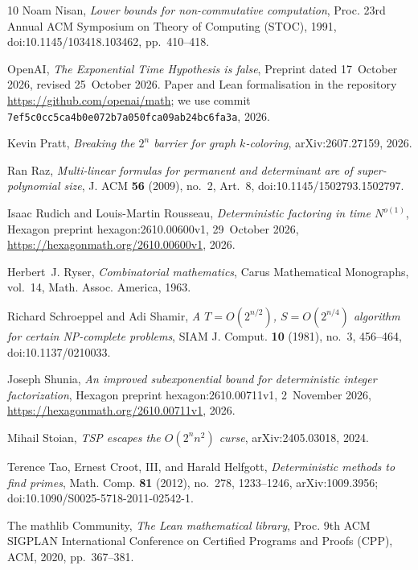 \documentclass[10pt]{amsart}
\theoremstyle{plain}
\theoremstyle{definition}
\theoremstyle{remark}
\numberwithin{equation}{section}
\begin{document}
\begin{thebibliography}{10}
Noam Nisan, \emph{Lower bounds for non-commutative computation}, Proc. 23rd
  Annual ACM Symposium on Theory of Computing (STOC), 1991,
  doi:10.1145/103418.103462, pp.~410--418.

{OpenAI}, \emph{The {E}xponential {T}ime {H}ypothesis is false}, Preprint dated
  17~October 2026, revised 25~October 2026. Paper and Lean formalisation in the
  repository \url{https://github.com/openai/math}; we use commit
  \texttt{7ef5c0cc5ca4b0e072b7a050fca09ab24bc6fa3a}, 2026.

Kevin Pratt, \emph{Breaking the $2^n$ barrier for graph $k$-coloring},
  arXiv:2607.27159, 2026.

Ran Raz, \emph{Multi-linear formulas for permanent and determinant are of
  super-polynomial size}, J. ACM \textbf{56} (2009), no.~2, Art.~8,
  doi:10.1145/1502793.1502797.

Isaac Rudich and Louis-Martin Rousseau, \emph{Deterministic factoring in time
  ${N}^{o(1)}$}, Hexagon preprint hexagon:2610.00600v1, 29~October 2026,
  \url{https://hexagonmath.org/2610.00600v1}, 2026.

Herbert~J. Ryser, \emph{Combinatorial mathematics}, Carus Mathematical
  Monographs, vol.~14, Math. Assoc. America, 1963.

Richard Schroeppel and Adi Shamir, \emph{A ${T}={O}(2^{n/2})$,
  ${S}={O}(2^{n/4})$ algorithm for certain {NP}-complete problems}, SIAM J.
  Comput. \textbf{10} (1981), no.~3, 456--464, doi:10.1137/0210033.

Joseph Shunia, \emph{An improved subexponential bound for deterministic integer
  factorization}, Hexagon preprint hexagon:2610.00711v1, 2~November 2026,
  \url{https://hexagonmath.org/2610.00711v1}, 2026.

Mihail Stoian, \emph{{TSP} escapes the ${O}(2^n n^2)$ curse}, arXiv:2405.03018,
  2024.

Terence Tao, Ernest Croot, III, and Harald Helfgott, \emph{Deterministic
  methods to find primes}, Math. Comp. \textbf{81} (2012), no.~278, 1233--1246,
  arXiv:1009.3956; doi:10.1090/S0025-5718-2011-02542-1.

{The mathlib Community}, \emph{The {L}ean mathematical library}, Proc. 9th ACM
  SIGPLAN International Conference on Certified Programs and Proofs (CPP), ACM,
  2020, pp.~367--381.


\end{thebibliography}
\end{document}
